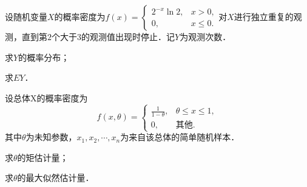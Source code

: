 \documentclass[plain,noanswer,medmath]{../../template/jnuexam}
\begin{document}
\begin{problem}[points=11]
设随机变量$X$的概率密度为$f(x) = \begin{cases}
  2^{- x}\ln 2, & x > 0, \\
             0, & x \le 0.
\end{cases}$对$X$进行独立重复的观测，直到第$2$个大于$3$的观测值出现时停止．记$Y$为观测次数．\par
\begin{enumerate*}
\item 求$Y$的概率分布；
\item 求$EY$．
\end{enumerate*}
\end{problem}


\begin{problem}[points=11]
设总体X的概率密度为
$$f(x,\theta) = \begin{cases}
  \frac{1}{1 - \theta}, & \theta \le x \le 1, \\
                     0, & \text{其他}.
\end{cases}$$
其中$\theta$为未知参数，$x_1,x_2, \cdots ,x_n$为来自该总体的简单随机样本．\par
\begin{enumerate*}
\item 求$\theta$的矩估计量；
\item 求$\theta$的最大似然估计量．
\end{enumerate*}
\end{problem}
\end{document}
